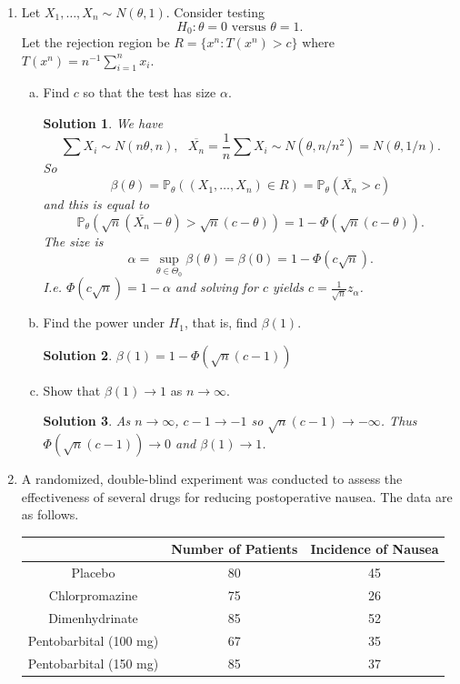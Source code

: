 \documentclass[10pt]{article}
\newtheorem*{sol}{Solution}
\renewcommand{\P}{\mathbb{P}}
\begin{document}
\begin{enumerate}
\item[(8)] Let $X_1,\ldots,X_n \sim N(\theta,1)$. Consider testing
\[
H_0 : \theta = 0 \text{ versus } \theta = 1.
\]
Let the rejection region be $R = \{x^n : T(x^n) > c\}$ where
$T(x^n) = n^{-1}\sum_{i=1}^n x_i$.
\begin{enumerate}[(a)]
\item Find $c$ so that the test has size $\alpha$.
\begin{sol}
We have
\[
\sum X_i \sim N(n\theta, n), \ \ \
\overline{X_n} = \frac{1}{n} \sum X_i \sim N(\theta, n/n^2) = N(\theta, 1/n).
\]
So
\[
\beta(\theta)=\P_\theta((X_1,\ldots,X_n) \in R) = \P_\theta(\overline{X_n} > c)
\]
and this is equal to
\[
\P_\theta(\sqrt{n}(\overline{X_n} - \theta) > \sqrt{n}(c-\theta))
= 1 - \Phi(\sqrt{n}(c-\theta)).
\]
The size is
\[
\alpha = \sup_{\theta \in \Theta_0} \beta(\theta) = \beta(0) =
1- \Phi(c\sqrt{n}).
\]
I.e. $\Phi(c\sqrt{n})=1-\alpha$ and solving for $c$ yields
$c=\frac{1}{\sqrt{n}}z_\alpha$.
\end{sol}
\item Find the power under $H_1$, that is, find $\beta(1)$.
\begin{sol}
$\beta(1) = 1-\Phi(\sqrt{n}(c-1))$
\end{sol}
\item Show that $\beta(1) \to 1$ as $n \to \infty$.
\begin{sol}
As $n\to \infty$, $c-1\to -1$ so $\sqrt{n}(c-1)\to -\infty$. Thus
\\ $\Phi(\sqrt{n}(c-1))\to 0$ and $\beta(1)\to 1$.
\end{sol}
\end{enumerate}

\item[(11)]
A randomized, double-blind experiment was conducted to assess the
effectiveness of several drugs for reducing postoperative nausea. The
data are as follows.

\begin{center}
\begin{tabular}{c|c|c}
& Number of Patients & Incidence of Nausea \\
\hline
Placebo & 80 & 45 \\
\hline
Chlorpromazine & 75 & 26 \\
\hline
Dimenhydrinate & 85 & 52 \\
\hline
Pentobarbital (100 mg) & 67 & 35 \\
\hline
Pentobarbital (150 mg) & 85 & 37 \\
\end{tabular}
\end{center}


\end{enumerate}
\end{document}
